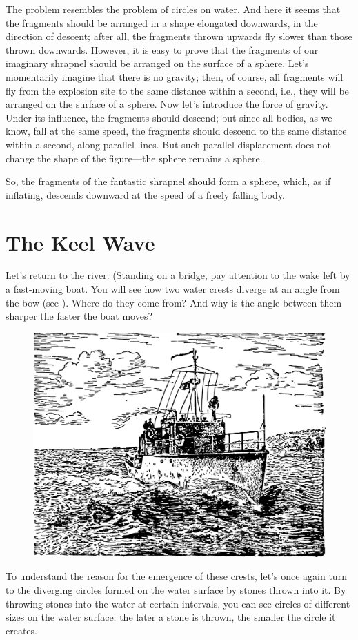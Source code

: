 \ans The problem resembles the problem of circles on water. And here it seems that the fragments should be arranged in a shape elongated downwards, in the direction of descent; after all, the fragments thrown upwards fly slower than those thrown downwards. However, it is easy to prove that the fragments of our imaginary shrapnel should be arranged on the surface of a sphere. Let's momentarily imagine that there is no gravity; then, of course, all fragments will fly from the explosion site to the same distance within a second, i.e., they will be arranged on the surface of a sphere. Now let's introduce the force of gravity. Under its influence, the fragments should descend; but since all bodies, as we know, fall at the same speed, the fragments should descend to the same distance within a second, along parallel lines. But such parallel displacement does not change the shape of the figure—the sphere remains a sphere.

So, the fragments of the fantastic shrapnel should form a sphere, which, as if inflating, descends downward at the speed of a freely falling body.

\section{The Keel Wave}
\label{sec-2.13}

Let's return to the river. (Standing on a bridge, pay attention to the wake left by a fast-moving boat. You will see how two water crests diverge at an angle from the bow (see ). Where do they come from? And why is the angle between them sharper the faster the boat moves?

\begin{figure}[h!]
\centering
\includegraphics[width=\textwidth]{figures/ch-02/fig-048.pdf}
\end{figure}
To understand the reason for the emergence of these crests, let's once again turn to the diverging circles formed on the water surface by stones thrown into it. By throwing stones into the water at certain intervals, you can see circles of different sizes on the water surface; the later a stone is thrown, the smaller the circle it creates. 


